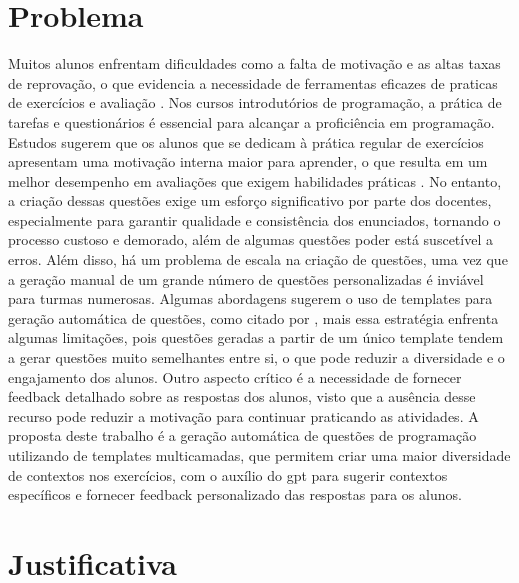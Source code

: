\section{Problema}
Muitos alunos enfrentam dificuldades como a falta de motivação e as altas taxas de reprovação, o que evidencia a necessidade de ferramentas eficazes de praticas de exercícios e avaliação \parencite{mbiada2022}. Nos cursos introdutórios de programação, a prática de  tarefas e questionários é essencial para alcançar a proficiência em programação. Estudos sugerem que os alunos que se dedicam à prática regular de exercícios apresentam uma motivação interna maior para aprender, o que resulta em um melhor desempenho em avaliações que exigem habilidades práticas \parencite{Edwards2019}. No entanto, a criação dessas questões exige um esforço significativo por parte dos docentes, especialmente para garantir qualidade e consistência dos enunciados, tornando o processo custoso e demorado, além de algumas questões poder está suscetível a erros. 
Além disso, há um problema de escala na criação de questões, uma vez que a geração manual de um grande número de questões personalizadas é inviável para turmas numerosas. Algumas abordagens sugerem o uso de templates para geração automática de questões, como citado por \parencite{zavala2018},  mais essa estratégia enfrenta algumas limitações, pois questões geradas a partir de um único template tendem a gerar questões muito semelhantes entre si, o que pode reduzir a diversidade e o engajamento dos alunos. Outro aspecto crítico é a necessidade de fornecer feedback detalhado sobre as respostas dos alunos, visto que a ausência desse recurso pode reduzir a motivação para continuar praticando as atividades.  A proposta deste trabalho é a geração automática de questões de programação utilizando de templates multicamadas, que permitem criar uma maior diversidade de contextos nos exercícios, com o auxílio do \gls{gpt} para sugerir contextos específicos e fornecer feedback personalizado das respostas para os alunos.



\section{Justificativa}

